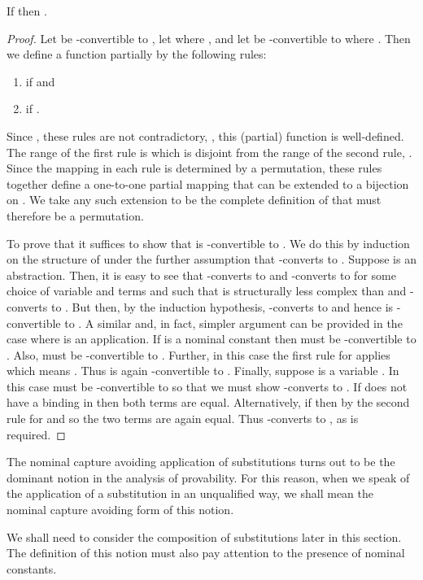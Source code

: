 \begin{lemma}
\label{lem:approx-cas}
If  then .
\end{lemma}
\begin{proof}
Let  be -convertible to , let  where , and let  be -convertible to
 where . Then we define a function  partially by the following
rules:
\begin{enumerate}
\item  if  and
\item  if .
\end{enumerate}
Since , these rules
are not contradictory, \ie, this (partial) function is well-defined.
The range of the first rule is  which is disjoint from the
range of the second rule, . Since the mapping in each
rule is determined by a permutation, these rules together define a
one-to-one partial mapping that can be extended to a bijection on
. We take any such extension to be the complete
definition of  that must therefore be a permutation.

To prove that  it suffices to
show that  is -convertible to
. We do this by induction on the structure
of  under the further assumption that  -converts to
. Suppose  is an abstraction. Then, it is easy to see
that  -converts to  and  -converts
to  for some choice of variable
 and terms  and  such that  is structurally less complex
than  and  -converts to . But then, by the
induction hypothesis,  -converts to
 and hence  is
-convertible to . A similar and, in
fact, simpler argument can be provided in the case where  is an
application. If  is a nominal constant  then
 must be -convertible to
. Also,
 must be -convertible to
. Further, in this case the first rule for  applies
which means . Thus  is again
-convertible to . Finally, suppose
 is a variable . In this case  must be -convertible
to  so that we must show  -converts to
. If  does not have a binding in  then
both terms are equal. Alternatively, if  then  by the second rule for  and so the two terms are again equal.
Thus  -converts to
, as is required.
\end{proof}

The nominal capture avoiding application of substitutions turns out to
be the dominant notion in the analysis of provability.
For this reason, when we speak of the application of a
substitution in an unqualified way, we shall mean the nominal capture
avoiding form of this notion.

We shall need to consider the composition of substitutions later in
this section. The definition of this notion must also pay attention to
the presence of nominal constants.

